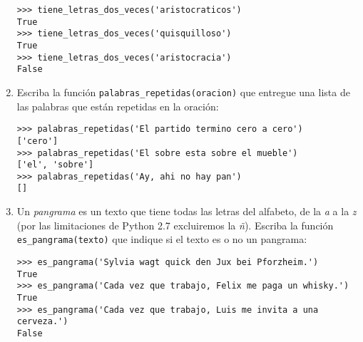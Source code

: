 \begin{enumerate}
\begin{lstlisting}
>>> tiene_letras_dos_veces('aristocraticos')
True
>>> tiene_letras_dos_veces('quisquilloso')
True
>>> tiene_letras_dos_veces('aristocracia')
False
\end{lstlisting}
\item
  Escriba la función \lstinline!palabras_repetidas(oracion)! que
  entregue una lista de las palabras que están repetidas en la oración:

\begin{lstlisting}
>>> palabras_repetidas('El partido termino cero a cero')
['cero']
>>> palabras_repetidas('El sobre esta sobre el mueble')
['el', 'sobre']
>>> palabras_repetidas('Ay, ahi no hay pan')
[]
\end{lstlisting}
\item
  Un \emph{pangrama} es un texto que tiene todas las letras del
  alfabeto, de la \emph{a} a la \emph{z}
  (por las limitaciones de Python 2.7 excluiremos la \emph{ñ}).
  Escriba la función \lstinline!es_pangrama(texto)!
  que indique si el texto es o no un pangrama:

\begin{lstlisting}
>>> es_pangrama('Sylvia wagt quick den Jux bei Pforzheim.')
True
>>> es_pangrama('Cada vez que trabajo, Felix me paga un whisky.')
True
>>> es_pangrama('Cada vez que trabajo, Luis me invita a una cerveza.')
False
\end{lstlisting}
\end{enumerate}
